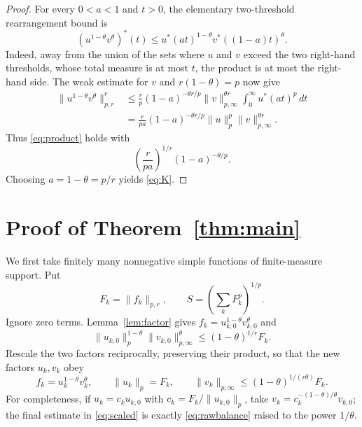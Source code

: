 \documentclass[11pt]{article}
\newcommand{\1}{\mathbf 1}
\newcommand{\dd}{\,d}
\begin{document}
\begin{proof}
For every $0<a<1$ and $t>0$, the elementary two-threshold rearrangement
bound is
\begin{equation}\label{eq:two-threshold}
 (u^{1-\theta}v^\theta)^*(t)
 \le u^*(at)^{1-\theta}v^*((1-a)t)^\theta.
\end{equation}
Indeed, away from the union of the sets where $u$ and $v$ exceed the two
right-hand thresholds, whose total measure is at most $t$, the product is
at most the right-hand side.  The weak estimate for $v$ and
$r(1-\theta)=p$ now give
\begin{align*}
 \|u^{1-\theta}v^\theta\|_{p,r}^r
 &\le \frac rp(1-a)^{-\theta r/p}
       \|v\|_{p,\infty}^{\theta r}
       \int_0^\infty u^*(at)^p\dd t\\
 &=\frac{r}{pa}(1-a)^{-\theta r/p}
       \|u\|_p^p\|v\|_{p,\infty}^{\theta r}.
\end{align*}
Thus \eqref{eq:product} holds with
\[
 \left(\frac{r}{pa}\right)^{1/r}(1-a)^{-\theta/p}.
\]
Choosing $a=1-\theta=p/r$ yields \eqref{eq:K}.
\end{proof}

\section{Proof of Theorem~\ref{thm:main}}

We first take finitely many nonnegative simple functions of finite-measure
support.  Put
\[
 F_k=\|f_k\|_{p,r},
 \qquad
 S=\left(\sum_kF_k^p\right)^{1/p}.
\]
Ignore zero terms.  Lemma~\ref{lem:factor} gives
$f_k=u_{k,0}^{1-\theta}v_{k,0}^\theta$ and
\begin{equation}\label{eq:rawbalance}
 \|u_{k,0}\|_p^{1-\theta}
 \|v_{k,0}\|_{p,\infty}^\theta
 \le (1-\theta)^{1/r}F_k.
\end{equation}
Rescale the two factors reciprocally, preserving their product, so that the
new factors $u_k,v_k$ obey
\begin{equation}\label{eq:scaled}
 f_k=u_k^{1-\theta}v_k^\theta,\qquad
 \|u_k\|_p=F_k,\qquad
 \|v_k\|_{p,\infty}
 \le (1-\theta)^{1/(r\theta)}F_k.
\end{equation}
For completeness, if $u_k=c_ku_{k,0}$ with
$c_k=F_k/\|u_{k,0}\|_p$, take
$v_k=c_k^{-(1-\theta)/\theta}v_{k,0}$; the final estimate in
\eqref{eq:scaled} is exactly \eqref{eq:rawbalance} raised to the power
$1/\theta$.
\end{document}
